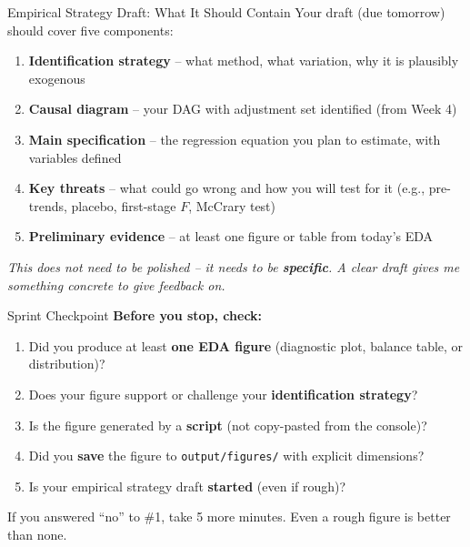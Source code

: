 \begin{frame}{Empirical Strategy Draft: What It Should Contain}
  Your draft (due tomorrow) should cover five components:

  \vspace{4pt}

  \begin{enumerate}
    \item \textbf{Identification strategy} -- what method, what variation, why it is plausibly exogenous
    \item \textbf{Causal diagram} -- your DAG with adjustment set identified (from Week 4)
    \item \textbf{Main specification} -- the regression equation you plan to estimate, with variables defined
    \item \textbf{Key threats} -- what could go wrong and how you will test for it (e.g., pre-trends, placebo, first-stage $F$, McCrary test)
    \item \textbf{Preliminary evidence} -- at least one figure or table from today's EDA
  \end{enumerate}

  \vspace{4pt}

  \textit{This does not need to be polished -- it needs to be \textbf{specific}. A clear draft gives me something concrete to give feedback on.}
\end{frame}


\begin{frame}{Sprint Checkpoint}
  \textbf{Before you stop, check:}

  \vspace{8pt}

  \begin{enumerate}
    \item Did you produce at least \textbf{one EDA figure} (diagnostic plot, balance table, or distribution)?
    \item Does your figure support or challenge your \textbf{identification strategy}?
    \item Is the figure generated by a \textbf{script} (not copy-pasted from the console)?
    \item Did you \textbf{save} the figure to \texttt{output/figures/} with explicit dimensions?
    \item Is your empirical strategy draft \textbf{started} (even if rough)?
  \end{enumerate}

  \vspace{8pt}

  If you answered ``no'' to \#1, take 5 more minutes. Even a rough figure is better than none.
\end{frame}


